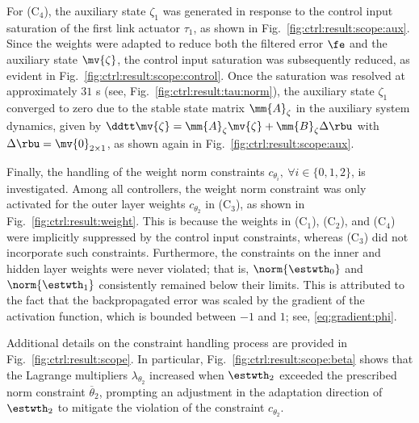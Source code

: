 \documentclass[journal]{IEEEtran}
\begin{document}
For (C$_4$), the auxiliary state $\zeta_1$ was generated in response to the control input saturation of the first link actuator $\tau_1$, as shown in Fig.~\ref{fig:ctrl:result:scope:aux}.
Since the weights were adapted to reduce both the filtered error $\fe$ and the auxiliary state $\mv{\zeta}$, the control input saturation was subsequently reduced, as evident in Fig.~\ref{fig:ctrl:result:scope:control}.
Once the saturation was resolved at approximately $31$ s (see, Fig.~\ref{fig:ctrl:result:tau:norm}), the auxiliary state $\zeta_1$ converged to zero due to the stable state matrix $\mm{A}_\zeta$ in the auxiliary system dynamics, given by $\ddtt\mv{\zeta} = \mm{A}_\zeta \mv{\zeta} + \mm{B}_\zeta \Delta\rbu$ with $\Delta\rbu=\mv{0}_{2\times1}$, as shown again in Fig.~\ref{fig:ctrl:result:scope:aux}.

\hfill 

Finally, the handling of the weight norm constraints $c_{\theta_i},\ \forall i\in\{0,1,2\}$, is investigated. 
Among all controllers, the weight norm constraint was only activated for the outer layer weights $c_{\theta_2}$ in (C$_3$), as shown in Fig.~\ref{fig:ctrl:result:weight}. 
This is because the weights in (C$_1$), (C$_2$), and (C$_4$) were implicitly suppressed by the control input constraints, whereas (C$_3$) did not incorporate such constraints.
Furthermore, the constraints on the inner and hidden layer weights were never violated; that is, $\norm{\estwth_0}$ and $\norm{\estwth_1}$ consistently remained below their limits.
This is attributed to the fact that the backpropagated error was scaled by the gradient of the activation function, which is bounded between $-1$ and $1$; see, \eqref{eq:gradient:phi}.

Additional details on the constraint handling process are provided in Fig.~\ref{fig:ctrl:result:scope}. 
In particular, Fig.~\ref{fig:ctrl:result:scope:beta} shows that the Lagrange multipliers $\lambda_{\theta_2}$ increased when $\estwth_2$ exceeded the prescribed norm constraint $\overline\theta_2$, prompting an adjustment in the adaptation direction of $\estwth_2$ to mitigate the violation of the constraint $c_{\theta_2}$.

\end{document}
